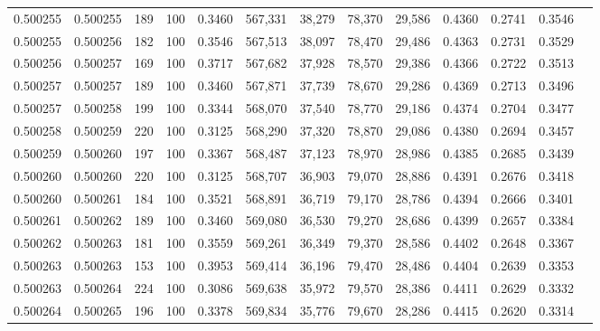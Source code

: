 \begin{tabular}{rrrrrrrrrrrrr}
0.500255 & 0.500255 &   189 & 100 &                                     0.3460 & 567,331 &  38,279 &  78,370 &  29,586 & 0.4360 & 0.2741 & 0.3546 \\
0.500255 & 0.500256 &   182 & 100 &                                     0.3546 & 567,513 &  38,097 &  78,470 &  29,486 & 0.4363 & 0.2731 & 0.3529 \\
0.500256 & 0.500257 &   169 & 100 &                                     0.3717 & 567,682 &  37,928 &  78,570 &  29,386 & 0.4366 & 0.2722 & 0.3513 \\
0.500257 & 0.500257 &   189 & 100 &                                     0.3460 & 567,871 &  37,739 &  78,670 &  29,286 & 0.4369 & 0.2713 & 0.3496 \\
0.500257 & 0.500258 &   199 & 100 &                                     0.3344 & 568,070 &  37,540 &  78,770 &  29,186 & 0.4374 & 0.2704 & 0.3477 \\
0.500258 & 0.500259 &   220 & 100 &                                     0.3125 & 568,290 &  37,320 &  78,870 &  29,086 & 0.4380 & 0.2694 & 0.3457 \\
0.500259 & 0.500260 &   197 & 100 &                                     0.3367 & 568,487 &  37,123 &  78,970 &  28,986 & 0.4385 & 0.2685 & 0.3439 \\
0.500260 & 0.500260 &   220 & 100 &                                     0.3125 & 568,707 &  36,903 &  79,070 &  28,886 & 0.4391 & 0.2676 & 0.3418 \\
0.500260 & 0.500261 &   184 & 100 &                                     0.3521 & 568,891 &  36,719 &  79,170 &  28,786 & 0.4394 & 0.2666 & 0.3401 \\
0.500261 & 0.500262 &   189 & 100 &                                     0.3460 & 569,080 &  36,530 &  79,270 &  28,686 & 0.4399 & 0.2657 & 0.3384 \\
0.500262 & 0.500263 &   181 & 100 &                                     0.3559 & 569,261 &  36,349 &  79,370 &  28,586 & 0.4402 & 0.2648 & 0.3367 \\
0.500263 & 0.500263 &   153 & 100 &                                     0.3953 & 569,414 &  36,196 &  79,470 &  28,486 & 0.4404 & 0.2639 & 0.3353 \\
0.500263 & 0.500264 &   224 & 100 &                                     0.3086 & 569,638 &  35,972 &  79,570 &  28,386 & 0.4411 & 0.2629 & 0.3332 \\
0.500264 & 0.500265 &   196 & 100 &                                     0.3378 & 569,834 &  35,776 &  79,670 &  28,286 & 0.4415 & 0.2620 & 0.3314 \\

\end{tabular}
